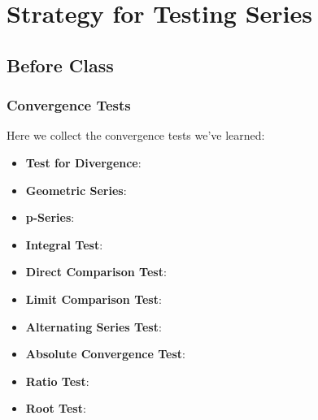 \documentclass[notes]{subfiles}
\begin{document}
	\fancyhead[LO,RE]{\bfseries \small \currentname}
	\fancyfoot[C]{{}}
	\fancyfoot[RO,LE]{\large \thepage}	%
	
\section*{Strategy for Testing Series}\label{cs117}
	\subsection*{Before Class}
	\subsubsection*{Convergence Tests}
		Here we collect the convergence tests we've learned:
		\begin{itemize}
			\item \textbf{Test for Divergence}:
				
			\item \textbf{Geometric Series}:
				
			\item \textbf{p-Series}:
				
			\item \textbf{Integral Test}:
				
			\item \textbf{Direct Comparison Test}:
				\newpage
				
			\item \textbf{Limit Comparison Test}:
				
			\item \textbf{Alternating Series Test}:
				
			\item \textbf{Absolute Convergence Test}:
				
			\item \textbf{Ratio Test}:
				
			\item \textbf{Root Test}:
		\end{itemize}
			\newpage
	
\end{document}

